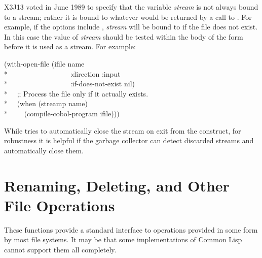 \begin{defmac}
\begin{newer}
X3J13 voted in June 1989 
to specify that the variable \emph{stream} is not always bound to
a stream; rather it is bound to whatever would be returned by
a call to .  For example, if the options include
, \emph{stream} will be bound to 
if the file does not exist.  In this case the value of \emph{stream}
should be tested within the body of the  form
before it is used as a stream.  For example:
\begin{lisp}
(with-open-file (ifile name \\*
~~~~~~~~~~~~~~~~~:direction :input \\*
~~~~~~~~~~~~~~~~~:if-does-not-exist nil) \\*
~~;; Process the file only if it actually exists. \\*
~~(when (streamp name)\\*
~~~~(compile-cobol-program ifile)))
\end{lisp}
\end{newer}
\end{defmac}

\beforenoterule
\begin{implementation}
While  tries to automatically close
the stream on exit from the construct, for robustness it is helpful
if the garbage collector can detect discarded streams and automatically
close them.
\end{implementation}
\afternoterule

\section{Renaming, Deleting, and Other File Operations}

These functions provide a standard interface to operations provided
in some form by most file systems.  It may be that some implementations
of Common Lisp cannot support them all completely.


